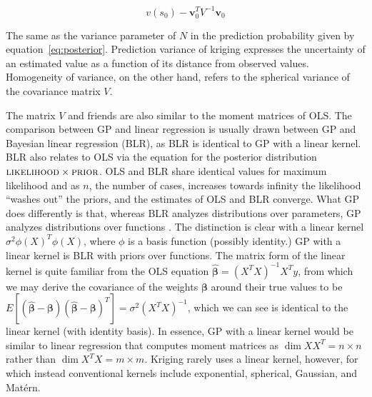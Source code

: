 \documentclass[draft]{article}
\begin{document}
\[v(s_0) - \bm{v}_0^T V^{-1} \bm{v}_0\]

The same as the variance parameter of $N$ in the prediction probability given by equation~\ref{eq:posterior}.  Prediction variance of kriging expresses the uncertainty of an estimated value as a function of its distance from observed values.  Homogeneity of variance, on the other hand, refers to the spherical variance of the covariance matrix $V$.

The matrix $V$ and friends are also similar to the moment matrices of OLS.  The comparison between GP and linear regression is usually drawn between GP and Bayesian linear regression (BLR), as BLR is identical to GP with a linear kernel.  BLR also relates to OLS via the equation for the posterior distribution $\textsc{likelihood} \times \textsc{prior}$.  OLS and BLR share identical values for maximum likelihood and as $n$, the number of cases, increases towards infinity the likelihood ``washes out'' the priors, and the estimates of OLS and BLR converge.  What GP does differently is that, whereas BLR analyzes distributions over parameters, GP analyzes distributions over functions \cite{williams97}.  The distinction is clear with a linear kernel $\sigma^2\phi(X)^T\phi(X)$, where $\phi$ is a basis function (possibly identity.)  GP with a linear kernel is BLR with priors over functions.  The matrix form of the linear kernel is quite familiar from the OLS equation $\hat{\bm{\beta}}=(X^TX)^{-1}X^Ty$, from which we may derive the covariance of the weights $\bm{\beta}$ around their true values to be $E[(\hat{\bm{\beta}} - \bm{\beta})(\hat{\bm{\beta}} - \bm{\beta})^T] = \sigma^2(X^TX)^{-1}$, which we can see is identical to the linear kernel (with identity basis).  In essence, GP with a linear kernel would be similar to linear regression that computes moment matrices as $\dim{XX^T}=n \times n$ rather than $\dim{X^TX}=m \times m$.  Kriging rarely uses a linear kernel, however, for which instead conventional kernels include exponential, spherical, Gaussian, and Mat\'{e}rn.
\end{document}
